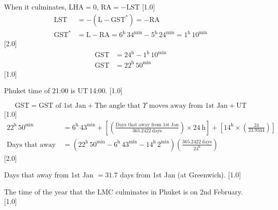 When it culminates, $\mathrm{LHA} = 0$,
$\mathrm{RA} = -\mathrm{LST}$ \hfill[1.0]
\begin{align*}
\mathrm{LST} &= -(\mathrm{L} - \mathrm{GST}^{*}) = -\mathrm{RA}\\
\mathrm{GST}^{*} &= \mathrm{L} - \mathrm{RA}
  = 6^{\mathrm{h}}\,34^{\mathrm{min}} - 5^{\mathrm{h}}\,24^{\mathrm{min}}
  = 1^{\mathrm{h}}\,10^{\mathrm{min}}
\end{align*}
\hfill[2.0]
\begin{align*}
\mathrm{GST} &= 24^{\mathrm{h}} - 1^{\mathrm{h}}\,10^{\mathrm{min}}\\
\mathrm{GST} &= 22^{\mathrm{h}}\,50^{\mathrm{min}}
\end{align*}
\hfill[1.0]

Phuket time of 21:00 is UT\,14:00. \hfill[1.0]

\[ \mathrm{GST} = \text{GST of 1st Jan}
   + \text{The angle that $\Upsilon$ moves away from 1st Jan}
   + \mathrm{UT} \]
\hfill[1.0]
\begin{align*}
22^{\mathrm{h}}\,50^{\mathrm{min}}
  &= 6^{\mathrm{h}}\,43^{\mathrm{min}}
   + \left[\left(\frac{\text{Days that away from 1st Jan}}
                     {365.2422\ \text{days}}\right)\times 24\ \mathrm{h}\right]
   + \left[14^{\mathrm{h}}\times\left(\frac{24}{23.9344}\right)\right]\\
\text{Days that away from 1st Jan}
  &= (22^{\mathrm{h}}\,50^{\mathrm{min}} - 6^{\mathrm{h}}\,43^{\mathrm{min}}
    - 14^{\mathrm{h}}\,2^{\mathrm{min}})
    \left(\frac{365.2422\ \text{days}}{24^{\mathrm{h}}}\right)
\end{align*}
\hfill[2.0]

Days that away from 1st Jan $= 31.7$ days from 1st Jan (at Greenwich).
\hfill[1.0]

The time of the year that the LMC culminates in Phuket is on 2nd February.
\hfill[1.0]
